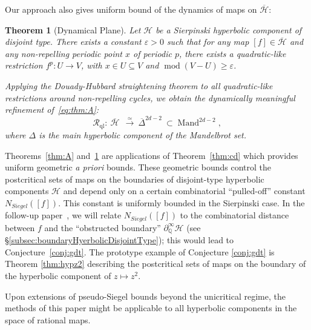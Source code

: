 \documentclass[11pt, reqno]{amsart}
\numberwithin{equation}{section}
\theoremstyle{plain}
\theoremstyle{theorem}
\theoremstyle{plain}
\newtheorem{maintheorem}{Theorem}
\theoremstyle{definition}
\newcommand{\Q}{\mathbb{Q}}
\DeclareMathOperator{\Mod}{mod}
\numberwithin{figure}{section}
\begin{document}
Our approach also gives uniform bound of the dynamics of maps on $\overline{\mathcal{H}}$:
\begin{maintheorem}[Dynamical Plane]\label{thm:B}
Let $\mathcal{H}$ be a Sierpinski hyperbolic component of disjoint type. 
There exists a constant $\varepsilon>0$ such that for any map $[f] \in \overline{\mathcal{H}}$ and any non-repelling periodic point $x$ of periodic $p$, there exists a quadratic-like restriction $f^p : U \longrightarrow V$, with $x \in U \subseteq V$ and $\Mod(V - U) \geq \varepsilon$. 

Applying the Douady-Hubbard straightening theorem to all quadratic-like restrictions around non-repelling cycles, we obtain the dynamically meaningful refinement of~\eqref{eq:thm:A}: 
\begin{equation}
\label{eq:thm:B}
     \mathcal R_{\operatorname{ql}}: \ \overline{\mathcal{H}}\ \ \overset{\simeq}{\longrightarrow}\ 
 \overline{\Delta}^{2d-2}\ \subset  {\operatorname{Mand}^{2d-2}},
\end{equation}
where $\Delta$ is the main hyperbolic component of the Mandelbrot set.
\end{maintheorem}


 Theorems~\ref{thm:A} and~\ref{thm:B} are applications of Theorem~\ref{thm:cd} which provides uniform geometric \emph{a priori} bounds. These geometric bounds control the postcritical sets of maps on the boundaries of disjoint-type hyperbolic components $\mathcal H$ and depend only on a certain combinatorial ``pulled-off'' constant $N_{Siegel}([f])$. This constant is uniformly bounded in the Sierpinski case. In the follow-up paper~\cite{DLuo}, we will relate $N_{Siegel}([f])$ to the combinatorial distance between $f$ and the ``obstructed boundary'' $\partial^\infty_\Q \mathcal{H}$ (see \S\ref{subsec:boundaryHyerbolicDisjointType}); this would lead to Conjecture~\ref{conj:gdt}. The prototype example of Conjecture \ref{conj:gdt} is Theorem \ref{thm:hypz2} describing the postcritical sets of maps on the boundary of the hyperbolic component of $z\mapsto z^2$. 

 

Upon extensions of pseudo-Siegel bounds beyond the unicritical regime, the methods of this paper might be applicable to all hyperbolic components in the space of rational maps.
\end{document}
